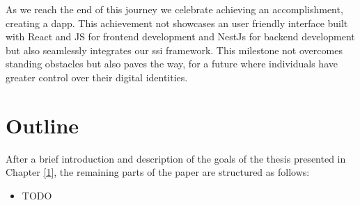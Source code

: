 As we reach the end of this journey we celebrate achieving an accomplishment, creating a \acrshort{dapp}. This achievement not showcases an user friendly interface 
built with React and JS for frontend development and NestJs for backend development but also seamlessly integrates our \acrshort{ssi} framework. This milestone not overcomes standing 
obstacles but also paves the way, for a future where individuals have greater control over their digital identities.

\section{Outline}

After a brief introduction and description of the goals of the thesis presented in Chapter 
\hyperref[ch:introduction]{[1]}, the remaining parts of the paper are structured as follows:

\begin{itemize}
    \item TODO
\end{itemize}


